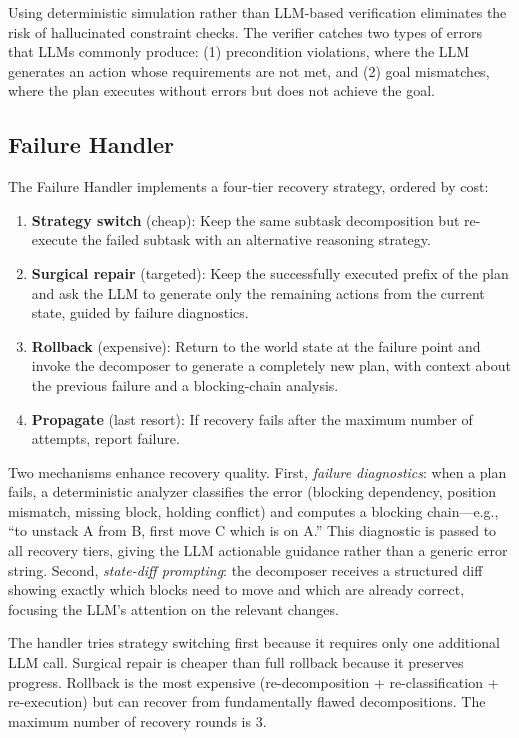 \documentclass{article}
\begin{document}
Using deterministic simulation rather than LLM-based verification eliminates the risk of hallucinated constraint checks. The verifier catches two types of errors that LLMs commonly produce: (1) precondition violations, where the LLM generates an action whose requirements are not met, and (2) goal mismatches, where the plan executes without errors but does not achieve the goal.

\subsection{Failure Handler}

The Failure Handler implements a four-tier recovery strategy, ordered by cost:

\begin{enumerate}[leftmargin=*]
    \item \textbf{Strategy switch} (cheap): Keep the same subtask decomposition but re-execute the failed subtask with an alternative reasoning strategy.
    \item \textbf{Surgical repair} (targeted): Keep the successfully executed prefix of the plan and ask the LLM to generate only the remaining actions from the current state, guided by failure diagnostics.
    \item \textbf{Rollback} (expensive): Return to the world state at the failure point and invoke the decomposer to generate a completely new plan, with context about the previous failure and a blocking-chain analysis.
    \item \textbf{Propagate} (last resort): If recovery fails after the maximum number of attempts, report failure.
\end{enumerate}

Two mechanisms enhance recovery quality. First, \textit{failure diagnostics}: when a plan fails, a deterministic analyzer classifies the error (blocking dependency, position mismatch, missing block, holding conflict) and computes a blocking chain---e.g., ``to unstack A from B, first move C which is on A.'' This diagnostic is passed to all recovery tiers, giving the LLM actionable guidance rather than a generic error string. Second, \textit{state-diff prompting}: the decomposer receives a structured diff showing exactly which blocks need to move and which are already correct, focusing the LLM's attention on the relevant changes.

The handler tries strategy switching first because it requires only one additional LLM call. Surgical repair is cheaper than full rollback because it preserves progress. Rollback is the most expensive (re-decomposition + re-classification + re-execution) but can recover from fundamentally flawed decompositions. The maximum number of recovery rounds is 3.
\end{document}
